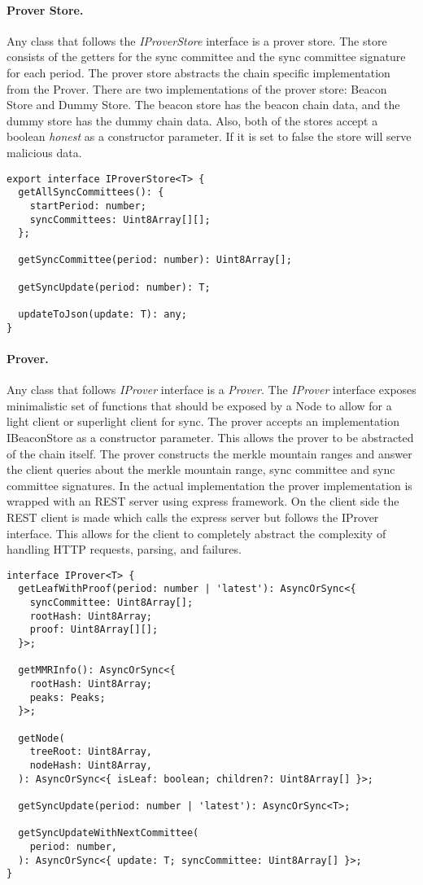 \documentclass[a4paper,11pt,oneside]{article}
\theoremstyle{definition}
\begin{document}
  \paragraph{Prover Store.} Any class that follows the \textit{IProverStore} interface is a prover store. The store consists of the getters for the sync committee and the sync committee signature for each period. The prover store abstracts the chain specific implementation from the Prover. There are two implementations of the prover store: Beacon Store and Dummy Store. The beacon store has the beacon chain data, and the dummy store has the dummy chain data. Also, both of the stores accept a boolean \textit{honest} as a constructor parameter. If it is set to false the store will serve malicious data.
  
  \begin{lstlisting}
export interface IProverStore<T> {
  getAllSyncCommittees(): {
    startPeriod: number;
    syncCommittees: Uint8Array[][];
  };

  getSyncCommittee(period: number): Uint8Array[];

  getSyncUpdate(period: number): T;

  updateToJson(update: T): any;
}
  \end{lstlisting}
  
  \paragraph{Prover.} Any class that follows \textit{IProver} interface is a \textit{Prover}.  The \textit{IProver} interface exposes minimalistic set of functions that should be exposed by a Node to allow for a light client or superlight client for sync. The prover accepts an implementation IBeaconStore as a constructor parameter. This allows the prover to be abstracted of the chain itself. The prover constructs the merkle mountain ranges and answer the client queries about the merkle mountain range, sync committee and sync committee signatures. In the actual implementation the prover implementation is wrapped with an REST server using express framework. On the client side the REST client is made which calls the express server but follows the IProver interface. This allows for the client to completely abstract the complexity of handling HTTP requests, parsing, and failures. 
  
  \begin{lstlisting}
interface IProver<T> {
  getLeafWithProof(period: number | 'latest'): AsyncOrSync<{
    syncCommittee: Uint8Array[];
    rootHash: Uint8Array;
    proof: Uint8Array[][];
  }>;

  getMMRInfo(): AsyncOrSync<{
    rootHash: Uint8Array;
    peaks: Peaks;
  }>;

  getNode(
    treeRoot: Uint8Array,
    nodeHash: Uint8Array,
  ): AsyncOrSync<{ isLeaf: boolean; children?: Uint8Array[] }>;

  getSyncUpdate(period: number | 'latest'): AsyncOrSync<T>;

  getSyncUpdateWithNextCommittee(
    period: number,
  ): AsyncOrSync<{ update: T; syncCommittee: Uint8Array[] }>;
}
  \end{lstlisting}
  
\end{document}
